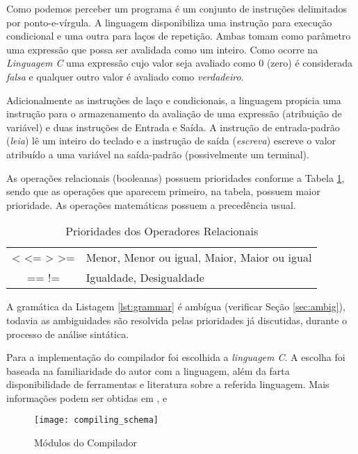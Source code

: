 Como podemos perceber um programa é um conjunto de instruções delimitados por
ponto-e-vírgula. A linguagem disponibiliza uma instrução para execução
condicional e uma outra para laços de repetição. Ambas tomam como parâmetro
uma expressão que possa ser avalidada como um inteiro. Como ocorre na
\emph{Linguagem C} uma expressão cujo valor seja avaliado como 0 (zero) é
considerada \emph{falsa} e qualquer outro valor é avaliado como
\emph{verdadeiro}.

Adicionalmente as instruções de laço e condicionais, a linguagem propicia uma
instrução para o armazenamento da avaliação de uma expressão (atribuição de
variável) e duas instruções de Entrada e Saída. A instrução de entrada-padrão
(\emph{leia}) lê um inteiro do teclado e a instrução de saída (\emph{escreva})
escreve o valor atribuído a uma variável na saída-padrão (possivelmente um
terminal).

As operações relacionais (booleanas) possuem prioridades conforme a Tabela
\ref{tab:prioridades}, sendo que as operações que aparecem primeiro, na
tabela, possuem maior prioridade. As operações matemáticas possuem a
precedência usual.

\begin{table}
	\begin{center}
		\begin{tabular}{c l}
			< <= > >= & Menor, Menor ou igual, Maior, Maior ou igual \\
			== !=      & Igualdade,  Desigualdade \\
		\end{tabular}
	\end{center}
	\caption{Prioridades dos Operadores Relacionais}
	\label{tab:prioridades}
\end{table}

A gramática da Listagem \ref{lst:grammar} é ambígua (verificar Seção
\ref{sec:ambig}), todavia as ambiguidades são resolvida pelas prioridades já
discutidas, durante o processo de análise sintática.

Para a implementação do compilador foi escolhida a \emph{linguagem C}. A
escolha foi baseada na familiaridade do autor com a linguagem, além da farta
disponibilidade de ferramentas e literatura sobre a referida linguagem. Mais
informações podem ser obtidas em ,  e

\begin{figure}[htb]
	\centering
	\texttt{[image: compiling\_schema]}
	\caption{Módulos do Compilador}
	\label{fig:compiler_schema}
\end{figure}

